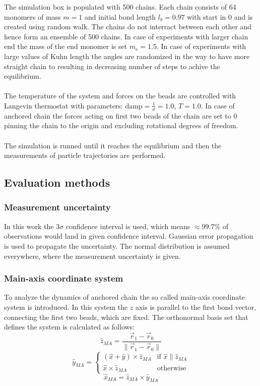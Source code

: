 \documentclass[
    paper=A4,pagesize=automedia,fontsize=12pt,
    BCOR=15mm,DIV=22,
    twoside,headinclude,footinclude=false,
    fleqn,             %
    bibliography=totocnumbered,          %
    listof=totoc,                %
    listof=flat,                 %
    cleardoublepage=empty      %
    numbers=endperiod
]{scrartcl}
\begin{document}
The simulation box is populated with 500 chains. Each chain consists of 64 monomers of mass $m=1$
and initial bond length $l_b=0.97$ with start in $0$ and is created using random walk. 
The chains do not interract between each other and hence form
an ensemble of 500 chains. In case of experiments with larger chain end the mass of the end monomer
is set $m_e=1.5$. In case of experiments with large values of Kuhn length the angles are randomized in 
the way to have more straight chain to resulting in decreasing number of steps to achive the
equilibrium.
\\
\\
The temperature of the system and forces on the beads are controlled with
Langevin thermostat with parameters: $\text{damp}=\frac{1}{\sigma}=1.0$, $T=1.0$. In case of anchored
chain the forces acting on first two beads of the chain are set to 0 pinning the chain to the origin
and excluding rotational degrees of freedom.
\\
\\
The simulation is runned until it reaches the equilibrium and then the measurements
of particle trajectories are performed. 

\subsection{Evaluation methods}

\subsubsection{Measurement uncertainty}
In this work the 3$\sigma$ confidence interval is used, which means
$\approx99.7 \%$ of observations would land in given confidence interval.
Gaussian error propagation is used to propagate the uncertainty. The normal
distribution is assumed everywhere, where the measurement uncertainty is given.
\subsubsection{Main-axis coordinate system}\label{sec:main-axis}
To analyze the dynamics of anchored chain the so called main-axis coordinate
system is introduced. In this system the $z$ axis is parallel to the
first bond vector, connecting the first two beads, which are fixed.
The orthonormal basis set that defines the system is calculated as follows:
\begin{equation}
    \hat{z}_{MA} = \frac{\vec{r}_1 - \vec{r}_0}{\| \vec{r}_1 - \vec{r}_0 \|}
\end{equation}
\begin{equation}
    \hat{y}_{MA} = 
    \begin{cases}
        (\hat{x} + \hat{y}) \times \hat{z}_{MA} & \text{if } \hat{x} \parallel \hat{z}_{MA} \\
        \hat{x} \times \hat{z}_{MA} & \text{otherwise}
    \end{cases}
\end{equation}
\begin{equation}
    \hat{x}_{MA} = \hat{z}_{MA} \times \hat{y}_{MA} 
\end{equation}
\end{document}
